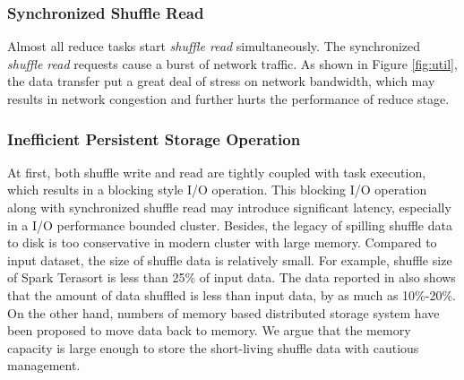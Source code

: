 \subsubsection{Synchronized Shuffle Read}
Almost all reduce tasks start \textit{shuffle read} simultaneously. The synchronized \textit{shuffle read} requests cause a burst of network traffic. As shown in Figure \ref{fig:util}, the data transfer put a great deal of stress on network bandwidth, which may results in network congestion and further hurts the performance of reduce stage.

\subsubsection{Inefficient Persistent Storage Operation}
At first, both shuffle write and read are tightly coupled with task execution, which results in a blocking style I/O operation. This blocking I/O operation along with synchronized shuffle read may introduce significant latency, especially in a I/O performance bounded cluster.
Besides, the legacy of spilling shuffle data to disk is too conservative in modern cluster with large memory. Compared to input dataset, the size of shuffle data is relatively small. For example, shuffle size of Spark Terasort \cite{spark-tera} is less than 25\% of input data. The data reported in \cite{makingsense} also shows that the amount of data shuffled is less than input data, by as much as 10\%-20\%. On the other hand, numbers of memory based distributed storage system have been proposed \cite{memcached, tachyon, ramcloud} to move data back to memory. 
We argue that the memory capacity is large enough to store the short-living shuffle data with cautious management.

